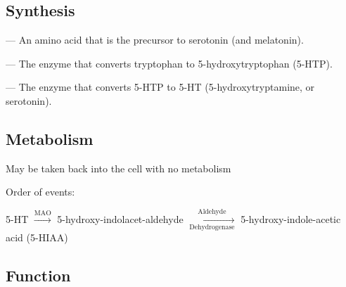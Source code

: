 \subsection{Synthesis}

\begin{coloredlist}
    \item {} — An amino acid that is the precursor to serotonin (and melatonin).
    \begin{coloredlist}
        \item {} — The enzyme that converts tryptophan to 5-hydroxytryptophan (5-HTP).
        \item {} — The enzyme that converts 5-HTP to 5-HT (5-hydroxytryptamine, or serotonin).
    \end{coloredlist}
\end{coloredlist}

\subsection{Metabolism}

\begin{coloredlist}
    \item May be taken back into the cell with no metabolism
    \item Order of events:
    \begin{coloredlist}
        \item 5-HT \(\xrightarrow{\text{MAO}}\) 5-hydroxy-indolacet-aldehyde \(\xrightarrow[\text{Dehydrogenase}]{\text{Aldehyde}}\) 5-hydroxy-indole-acetic acid (5-HIAA)
    \end{coloredlist}
\end{coloredlist}

\subsection{Function}

